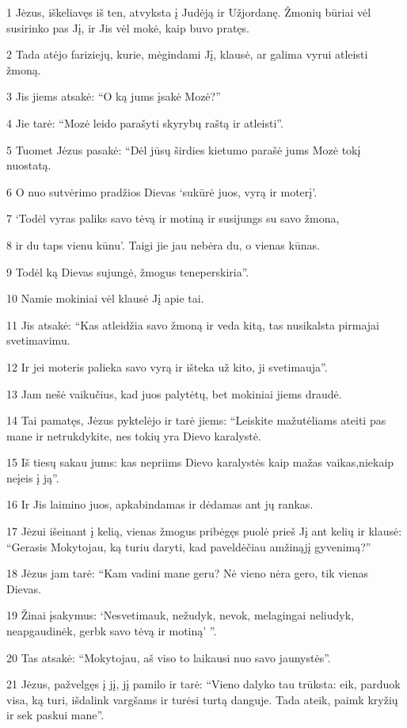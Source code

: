 \par 1 Jėzus, iškeliavęs iš ten, atvyksta į Judėją ir Užjordanę. Žmonių būriai vėl susirinko pas Jį, ir Jis vėl mokė, kaip buvo pratęs. 
\par 2 Tada atėjo fariziejų, kurie, mėgindami Jį, klausė, ar galima vyrui atleisti žmoną. 
\par 3 Jis jiems atsakė: “O ką jums įsakė Mozė?” 
\par 4 Jie tarė: “Mozė leido parašyti skyrybų raštą ir atleisti”. 
\par 5 Tuomet Jėzus pasakė: “Dėl jūsų širdies kietumo parašė jums Mozė tokį nuostatą. 
\par 6 O nuo sutvėrimo pradžios Dievas ‘sukūrė juos, vyrą ir moterį’. 
\par 7 ‘Todėl vyras paliks savo tėvą ir motiną ir susijungs su savo žmona, 
\par 8 ir du taps vienu kūnu’. Taigi jie jau nebėra du, o vienas kūnas. 
\par 9 Todėl ką Dievas sujungė, žmogus teneperskiria”. 
\par 10 Namie mokiniai vėl klausė Jį apie tai. 
\par 11 Jis atsakė: “Kas atleidžia savo žmoną ir veda kitą, tas nusikalsta pirmajai svetimavimu. 
\par 12 Ir jei moteris palieka savo vyrą ir išteka už kito, ji svetimauja”. 
\par 13 Jam nešė vaikučius, kad juos palytėtų, bet mokiniai jiems draudė. 
\par 14 Tai pamatęs, Jėzus pyktelėjo ir tarė jiems: “Leiskite mažutėliams ateiti pas mane ir netrukdykite, nes tokių yra Dievo karalystė. 
\par 15 Iš tiesų sakau jums: kas nepriims Dievo karalystės kaip mažas vaikas,­niekaip neįeis į ją”. 
\par 16 Ir Jis laimino juos, apkabindamas ir dėdamas ant jų rankas. 
\par 17 Jėzui išeinant į kelią, vienas žmogus pribėgęs puolė prieš Jį ant kelių ir klausė: “Gerasis Mokytojau, ką turiu daryti, kad paveldėčiau amžinąjį gyvenimą?” 
\par 18 Jėzus jam tarė: “Kam vadini mane geru? Nė vieno nėra gero, tik vienas Dievas. 
\par 19 Žinai įsakymus: ‘Nesvetimauk, nežudyk, nevok, melagingai neliudyk, neapgaudinėk, gerbk savo tėvą ir motiną’ ”. 
\par 20 Tas atsakė: “Mokytojau, aš viso to laikausi nuo savo jaunystės”. 
\par 21 Jėzus, pažvelgęs į jį, jį pamilo ir tarė: “Vieno dalyko tau trūksta: eik, parduok visa, ką turi, išdalink vargšams ir turėsi turtą danguje. Tada ateik, paimk kryžių ir sek paskui mane”. 
